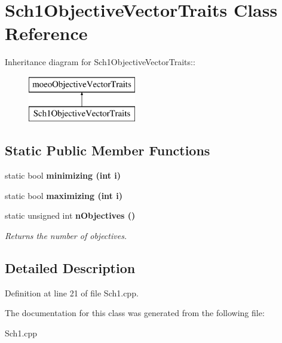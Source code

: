 \section{Sch1Objective\-Vector\-Traits Class Reference}
\label{classSch1ObjectiveVectorTraits}
Inheritance diagram for Sch1Objective\-Vector\-Traits::\begin{figure}[H]
\begin{center}
\leavevmode
\includegraphics[height=2cm]{classSch1ObjectiveVectorTraits}
\end{center}
\end{figure}
\subsection*{Static Public Member Functions}
\begin{CompactItemize}
\item 
static bool \bf{minimizing} (int i)\label{classSch1ObjectiveVectorTraits_455ac35e419ad21c0a4ba4bbd2768ca5}

\item 
static bool \bf{maximizing} (int i)\label{classSch1ObjectiveVectorTraits_a7de212f3346dde550757e8a412baa4d}

\item 
static unsigned int \bf{n\-Objectives} ()\label{classSch1ObjectiveVectorTraits_54ae04aa8eb052223778ecae175be95b}

\begin{CompactList}\small\item\em Returns the number of objectives. \item\end{CompactList}\end{CompactItemize}


\subsection{Detailed Description}




Definition at line 21 of file Sch1.cpp.

The documentation for this class was generated from the following file:\begin{CompactItemize}
\item 
Sch1.cpp\end{CompactItemize}
